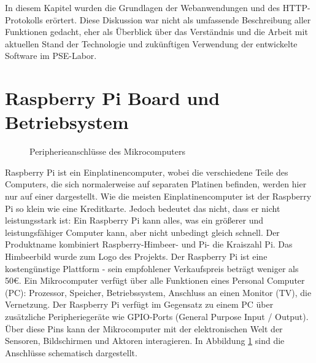 In diesem Kapitel wurden die Grundlagen der Webanwendungen und des HTTP-Protokolls erörtert. Diese Diskussion war nicht als umfassende Beschreibung aller Funktionen gedacht, eher als Überblick über das Verständnis und die Arbeit mit aktuellen Stand der Technologie und zukünftigen Verwendung der entwickelte Software im PSE-Labor. 

\section{Raspberry Pi Board und Betriebsystem }
\label{sec:theorie:raspberry}
\begin{figure}
	\caption{Peripherieanschlüsse des Mikrocomputers}
	\label{fig:rasp}
\end{figure}
Raspberry Pi ist ein Einplatinencomputer, wobei die verschiedene Teile des Computers, die sich normalerweise auf separaten Platinen befinden, werden hier nur auf einer dargestellt. Wie die meisten Einplatinencomputer ist der Raspberry Pi so klein wie eine Kreditkarte. Jedoch bedeutet das nicht, dass er nicht leistungsstark ist: Ein Raspberry Pi kann alles, was ein größerer und leistungsfähiger Computer kann, aber nicht unbedingt gleich schnell. Der Produktname kombiniert Raspberry-Himbeer- und Pi- die Kraiszahl Pi. Das Himbeerbild wurde zum Logo des Projekts. Der Raspberry Pi ist eine kostengünstige Plattform - sein empfohlener Verkaufspreis beträgt weniger als 50€. Ein Mikrocomputer verfügt über alle Funktionen eines Personal Computer (PC): Prozessor, Speicher, Betriebssystem, Anschluss an einen Monitor (TV), die Vernetzung. Der Raspberry Pi verfügt im Gegensatz zu einem PC über zusätzliche Peripheriegeräte wie GPIO-Ports (General Purpose Input / Output). Über diese Pins kann der Mikrocomputer mit der elektronischen Welt der Sensoren, Bildschirmen und Aktoren interagieren. In Abbildung \ref{fig:rasp}\cite{website:3} sind die Anschlüsse schematisch dargestellt.

